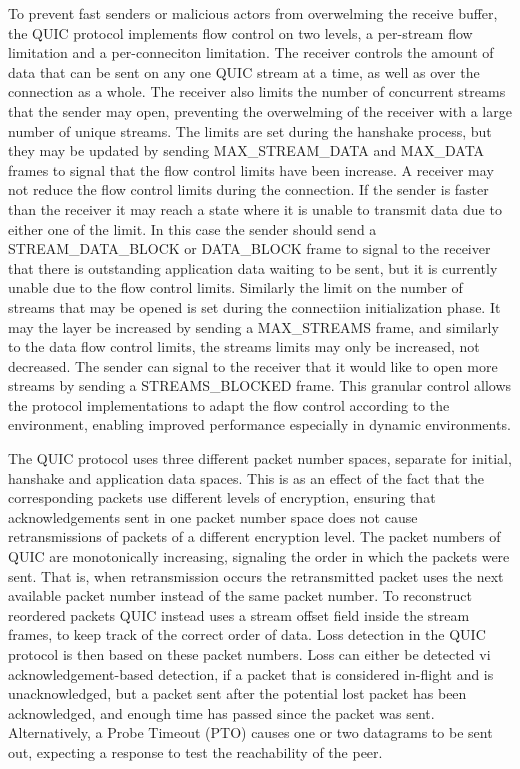 \documentclass[english, 12pt, a4paper, elec, utf8, a-2b, online]{aaltothesis}
\begin{document}
To prevent fast senders or malicious actors from overwelming the receive buffer,
the QUIC protocol implements flow control on two levels, a per-stream flow limitation
and a per-conneciton limitation. The receiver controls the amount of data that can
be sent on any one QUIC stream at a time, as well as over the connection as a whole.
The receiver also limits the number of concurrent streams that the sender may open,
preventing the overwelming of the receiver with a large number of unique streams.
The limits are set during the hanshake process, but they may be updated by sending
MAX\_STREAM\_DATA and MAX\_DATA frames to signal that the flow control limits have
been increase. A receiver may not reduce the flow control limits during the connection.
If the sender is faster than the receiver it may reach a state where it is unable
to transmit data due to either one of the limit. In this case the sender should
send a STREAM\_DATA\_BLOCK or DATA\_BLOCK frame to signal to the receiver that
there is outstanding application data waiting to be sent, but it is currently unable
due to the flow control limits. Similarly the limit on the number of streams that
may be opened is set during the connectiion initialization phase. It may the layer be
increased by sending a MAX\_STREAMS frame, and similarly to the data flow control limits,
the streams limits may only be increased, not decreased. The sender can signal to the
receiver that it would like to open more streams by sending a STREAMS\_BLOCKED frame\cite{rfc9000}.
This granular control allows the protocol implementations to adapt the flow control
according to the environment, enabling improved performance especially in dynamic environments.

The QUIC protocol uses three different packet number spaces, separate for initial,
hanshake and application data spaces. This is as an effect of the fact that the
corresponding packets use different levels of encryption, ensuring that acknowledgements
sent in one packet number space does not cause retransmissions of packets of a different
encryption level. The packet numbers of QUIC are monotonically increasing, signaling
the order in which the packets were sent. That is, when retransmission occurs the
retransmitted packet uses the next available packet number instead of the same packet number.
To reconstruct reordered packets QUIC instead
uses a stream offset field inside the stream frames, to keep track of the correct
order of data. Loss detection in the QUIC protocol is then based on these packet
numbers. Loss can either be detected vi acknowledgement-based detection,
if a packet that is considered in-flight and is unacknowledged, but a packet
sent after the potential lost packet has been acknowledged, and enough time has passed
since the packet was sent. Alternatively, a Probe Timeout (PTO) causes one or two
datagrams to be sent out, expecting a response to test the reachability of the peer\cite{rfc9002}.
\end{document}
